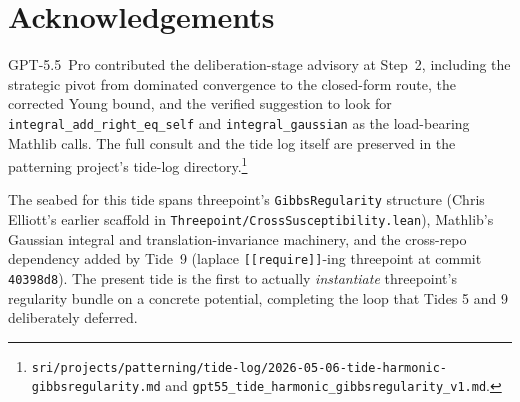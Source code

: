 \documentclass[11pt]{article}
\begin{document}
\section*{Acknowledgements}

GPT-5.5~Pro contributed the deliberation-stage advisory at Step~2,
including the strategic pivot from dominated convergence to the
closed-form route, the corrected Young bound, and the verified
suggestion to look for \texttt{integral\_add\_right\_eq\_self} and
\texttt{integral\_gaussian} as the load-bearing Mathlib calls. The
full consult and the tide log itself are preserved in the patterning
project's tide-log directory.\footnote{\texttt{sri/projects/patterning/tide-log/}\allowbreak\texttt{2026-05-06-tide-harmonic-gibbsregularity.md}
and \texttt{gpt55\_tide\_harmonic\_gibbsregularity\_v1.md}.}

The seabed for this tide spans threepoint's
\texttt{GibbsRegularity} structure (Chris Elliott's earlier scaffold
in \texttt{Threepoint/CrossSusceptibility.lean}), Mathlib's Gaussian
integral and translation-invariance machinery, and the cross-repo
dependency added by Tide~9 (laplace
\texttt{[[require]]}-ing threepoint at commit \texttt{40398d8}).
The present tide is the first to actually \emph{instantiate}
threepoint's regularity bundle on a concrete potential, completing
the loop that Tides 5 and 9 deliberately deferred.
\end{document}
